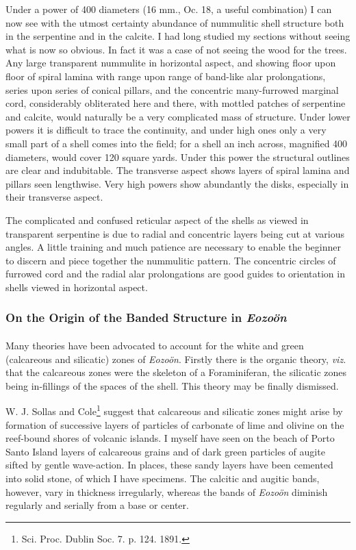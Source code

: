 \documentclass[a4paper, 12pt, oneside]{article}
\begin{document}
Under a power of 400 diameters (16 mm., Oc. 18, a useful combination) I can now see with the utmost certainty abundance of nummulitic shell structure both in the serpentine and in the calcite. I had long studied my sections without seeing what is now so obvious. In fact it was a case of not seeing the wood for the trees. Any large transparent nummulite in horizontal aspect, and showing floor upon floor of spiral lamina with range upon range of band-like alar prolongations, series upon series of conical pillars, and the concentric many-furrowed marginal cord, considerably obliterated here and there, with mottled patches of serpentine and calcite, would naturally be a very complicated mass of structure. Under lower powers it is difficult to trace the continuity, and under high ones only a very small part of a shell comes into the field; for a shell an inch across, magnified 400 diameters, would cover 120 square yards. Under this power the structural outlines are clear and indubitable. The transverse aspect shows layers of spiral lamina and pillars seen lengthwise. Very high powers show abundantly the disks, especially in their transverse aspect.

The complicated and confused reticular aspect of the shells as viewed in transparent serpentine is due to radial and concentric layers being cut at various angles. A little training and much patience are necessary to enable the beginner to discern and piece together the nummulitic pattern. The concentric circles of furrowed cord and the radial alar prolongations are good guides to orientation in shells viewed in horizontal aspect.

\subsubsection{On the Origin of the Banded Structure in \emph{Eozoön}}
\paragraph{}
Many theories have been advocated to account for the white and green (calcareous and silicatic) zones of \emph{Eozoön}. Firstly there is the organic theory, \emph{viz.} that the calcareous zones were the skeleton of a Foraminiferan, the silicatic zones being in-fillings of the spaces of the shell. This theory may be finally dismissed.

W. J. Sollas and Cole\footnote{Sci. Proc. Dublin Soc. 7. p. 124. 1891.} suggest that calcareous and silicatic zones might arise by formation of successive layers of particles of carbonate of lime and olivine on the reef-bound shores of volcanic islands. I myself have seen on the beach of Porto Santo Island layers of calcareous grains and of dark green particles of augite sifted by gentle wave-action. In places, these sandy layers have been cemented into solid stone, of which I have specimens. The calcitic and augitic bands, however, vary in thickness irregularly, whereas the bands of \emph{Eozoön} diminish regularly and serially from a base or center.
\end{document}
